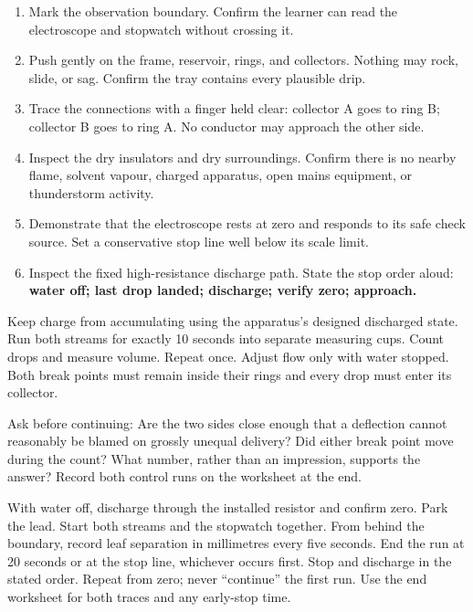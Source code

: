 \begin{enumerate}
\item Mark the observation boundary. Confirm the learner can read the
electroscope and stopwatch without crossing it.
\item Push gently on the frame, reservoir, rings, and collectors. Nothing may
rock, slide, or sag. Confirm the tray contains every plausible drip.
\item Trace the connections with a finger held clear: collector A goes to ring
B; collector B goes to ring A. No conductor may approach the other side.
\item Inspect the dry insulators and dry surroundings. Confirm there is no
nearby flame, solvent vapour, charged apparatus, open mains equipment, or
thunderstorm activity.
\item Demonstrate that the electroscope rests at zero and responds to its safe
check source. Set a conservative stop line well below its scale limit.
\item Inspect the fixed high-resistance discharge path. State the stop order
aloud: \textbf{water off; last drop landed; discharge; verify zero; approach.}
\end{enumerate}

Keep charge from accumulating using the apparatus's designed discharged state.
Run both streams for exactly 10 seconds into separate measuring cups. Count
drops and measure volume. Repeat once. Adjust flow only with water stopped.
Both break points must remain inside their rings and every drop must enter its
collector.

\noindent Ask before continuing: Are the two sides close enough that a
deflection cannot reasonably be blamed on grossly unequal delivery? Did either
break point move during the count? What number, rather than an impression,
supports the answer? Record both control runs on the worksheet at the end.

With water off, discharge through the installed resistor and confirm zero.
Park the lead. Start both streams and the stopwatch together. From behind the
boundary, record leaf separation in millimetres every five seconds. End the run
at 20 seconds or at the stop line, whichever occurs first. Stop and discharge
in the stated order. Repeat from zero; never ``continue'' the first run.
Use the end worksheet for both traces and any early-stop time.

